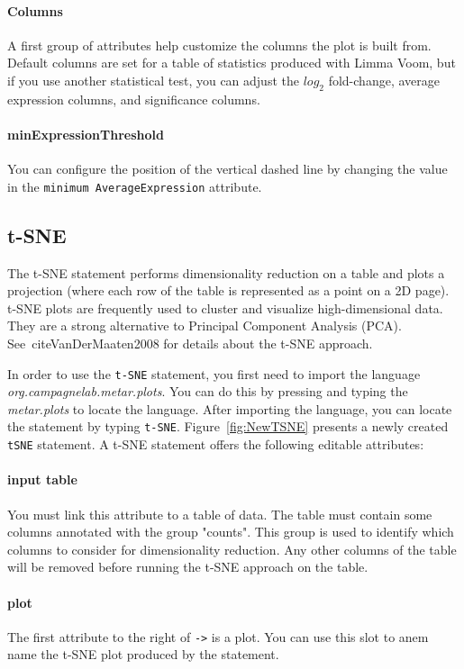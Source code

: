 \paragraph{Columns}
A first group of attributes help customize the columns the plot is built from. Default columns are set for a table of statistics produced with Limma Voom, but if you use another statistical test, you can adjust the $log_2$ fold-change, average expression columns, and significance columns.
\paragraph{minExpressionThreshold}
You can configure the position of the vertical dashed line by changing the value in the \texttt{minimum AverageExpression} attribute.

\subsection{t-SNE}
The t-SNE statement performs dimensionality reduction on a table and plots a  projection (where each row of the table is represented as a point on a 2D page). t-SNE plots are frequently  used to cluster and visualize high-dimensional data. They are a strong alternative to Principal Component Analysis (PCA). See~cite{VanDerMaaten2008} for details about the t-SNE approach.  

In order to use the \texttt{t-SNE} statement, you first need to import the language \textit{org.campagnelab.metar.plots}. You can do this by pressing  and typing the \textit{metar.plots} to locate the language.
After importing the language, you can locate the statement by typing \texttt{t-SNE}. Figure~\ref{fig:NewTSNE} presents a newly created \texttt{tSNE} statement. 
A t-SNE statement offers the following editable attributes:

\paragraph{input table} You must link this attribute to a table of data. The table must contain some columns annotated with the group "counts". This group is used to identify which columns to consider for dimensionality reduction. Any other columns of the table will be removed before running the t-SNE approach on the table.
\paragraph{plot} The first attribute to the right of \texttt{->} is a plot. You can use this slot to anem  name the t-SNE plot produced by the statement.

